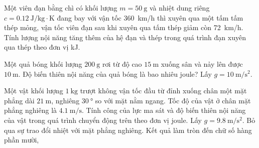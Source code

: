 \begin{ex}
	Một viên đạn bằng chì có khối lượng $m=\SI{50}{\gram}$ và nhiệt dung riêng $c=\SI{0.12}{\joule/\kilogram\cdot\kelvin}$ đang bay với vận tốc \SI{360}{\kilo\meter/\hour} thì xuyên qua một tấm tấm thép mỏng, vận tốc viên đạn sau khi xuyên qua tấm thép giảm còn \SI{72}{\kilo\meter/\hour}. Tính lượng nội năng tăng thêm của hệ đạn và thép trong quá trình đạn xuyên qua thép theo đơn vị \si{\kilo\joule}.
\end{ex}
\begin{ex}
	Một quả bóng khối lượng $\SI{200}{\gram}$ rơi từ độ cao $\SI{15}{\meter}$ xuống sân và nảy lên được $\SI{10}{\meter}$. Độ biến thiên nội năng của quả bóng là bao nhiêu joule? Lấy $g=\SI{10}{\meter/\second^2}$.
\end{ex}

\begin{ex}
	Một vật khối lượng $\SI{1}{\kilogram}$ trượt không vận tốc đầu từ đỉnh xuống chân một mặt phẳng dài $\SI{21}{\meter}$, nghiêng $\SI{30}{\degree}$ so với mặt nằm ngang. Tốc độ của vật ở chân mặt phẳng nghiêng là $\SI{4.1}{\meter/\second}$. Tính công của lực ma sát và độ biến thiên nội năng của vật trong quá trình chuyển động trên theo đơn vị joule. Lấy $g=\SI{9.8}{\meter/\second^2}$. Bỏ qua sự trao đổi nhiệt với mặt phẳng nghiêng. Kết quả làm tròn đến chữ số hàng phần mười,
\end{ex}
